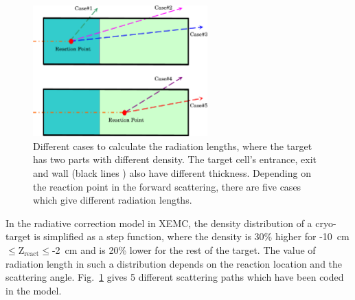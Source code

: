 \begin{figure}[!ht]
 \begin{center}
  \includegraphics[angle=0,width=0.6\textwidth]{./figures/xemc/radc_cases}
  \caption[Different cases to calculate the radiation lengths]{\footnotesize{Different cases to calculate the radiation lengths, where the target has two parts with different density. The target cell's entrance, exit and wall (black lines ) also have different thickness. Depending on the reaction point in the forward scattering, there are five cases which give different radiation lengths.}}
  \label{radc_cases}
 \end{center}
\end{figure}
  In the radiative correction model in XEMC, the density distribution of a cryo-target is simplified as a step function, where the density is 30\% higher for -10~cm$\mathrm{\leq Z_{react}}\leq$-2~cm and is 20\% lower for the rest of the target. The value of radiation length in such a distribution depends on the reaction location and the scattering angle. Fig.~\ref{radc_cases} gives 5 different scattering paths which have been coded in the model. 
  
